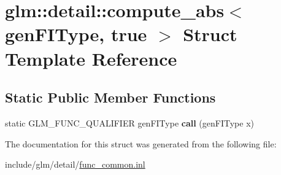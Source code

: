 \hypertarget{structglm_1_1detail_1_1compute__abs_3_01genFIType_00_01true_01_4}{}\section{glm\+:\+:detail\+:\+:compute\+\_\+abs$<$ gen\+F\+I\+Type, true $>$ Struct Template Reference}
\label{structglm_1_1detail_1_1compute__abs_3_01genFIType_00_01true_01_4}
\subsection*{Static Public Member Functions}
\begin{DoxyCompactItemize}
\item 
\mbox{\label{structglm_1_1detail_1_1compute__abs_3_01genFIType_00_01true_01_4_aa71d12c5d1f14e48f3be96bdf6b95861}} 
static G\+L\+M\+\_\+\+F\+U\+N\+C\+\_\+\+Q\+U\+A\+L\+I\+F\+I\+ER gen\+F\+I\+Type {\bfseries call} (gen\+F\+I\+Type x)
\end{DoxyCompactItemize}


The documentation for this struct was generated from the following file\+:\begin{DoxyCompactItemize}
\item 
include/glm/detail/\hyperlink{func__common_8inl}{func\+\_\+common.\+inl}\end{DoxyCompactItemize}
